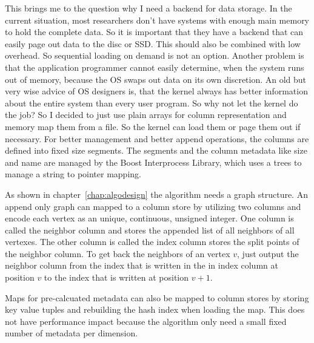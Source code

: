 This brings me to the question why I need a backend for data storage. In the current situation, most researchers don't have systems with enough main memory to hold the complete data. So it is important that they have a backend that can easily page out data to the disc or SSD. This should also be combined with low overhead. So sequential loading on demand is not an option. Another problem is that the application programmer cannot easily determine, when the system runs out of memory, because the OS swaps out data on its own discretion. An old but very wise advice of OS designers is, that the kernel always has better information about the entire system than every user program. So why not let the kernel do the job? So I decided to just use plain arrays for column representation and memory map them from a file. So the kernel can load them or page them out if necessary. For better management and better append operations, the columns are defined into fixed size segments. The segments and the column metadata like size and name are managed by the Boost Interprocess Library, which uses a trees to manage a string to pointer mapping.

As shown in chapter~\ref{chap:algodesign} the algorithm needs a graph structure. An append only graph can mapped to a column store by utilizing two columns and encode each vertex as an unique, continuous, unsigned integer. One column is called the neighbor column and stores the appended list of all neighbors of all vertexes. The other column is called the index column stores the split points of the neighbor column. To get back the neighbors of an vertex $v$, just output the neighbor column from the index that is written in the in index column at position $v$ to the index that is written at position $v+1$.

Maps for pre-calcuated metadata can also be mapped to column stores by storing key value tuples and rebuilding the hash index when loading the map. This does not have performance impact because the algorithm only need a small fixed number of metadata per dimension.

